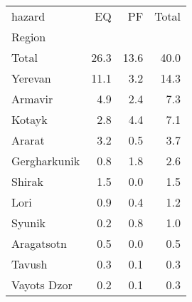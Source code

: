 \begin{tabular}{lrrr}
\toprule
hazard &    EQ &    PF &  Total \\
Region       &       &       &        \\
\midrule
Total        &  26.3 &  13.6 &   40.0 \\
Yerevan      &  11.1 &   3.2 &   14.3 \\
Armavir      &   4.9 &   2.4 &    7.3 \\
Kotayk       &   2.8 &   4.4 &    7.1 \\
Ararat       &   3.2 &   0.5 &    3.7 \\
Gergharkunik &   0.8 &   1.8 &    2.6 \\
Shirak       &   1.5 &   0.0 &    1.5 \\
Lori         &   0.9 &   0.4 &    1.2 \\
Syunik       &   0.2 &   0.8 &    1.0 \\
Aragatsotn   &   0.5 &   0.0 &    0.5 \\
Tavush       &   0.3 &   0.1 &    0.3 \\
Vayots Dzor  &   0.2 &   0.1 &    0.3 \\
\bottomrule
\end{tabular}
